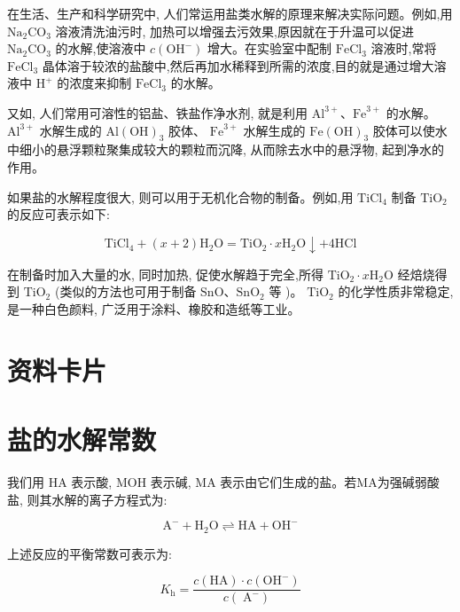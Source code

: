 \documentclass[10pt]{article}
\begin{document}
在生活、生产和科学研究中, 人们常运用盐类水解的原理来解决实际问题。例如,用 \({\mathrm{{Na}}}_{2}{\mathrm{{CO}}}_{3}\) 溶液清洗油污时, 加热可以增强去污效果,原因就在于升温可以促进 \({\mathrm{{Na}}}_{2}{\mathrm{{CO}}}_{3}\) 的水解,使溶液中 \(c\left( {\mathrm{{OH}}}^{ - }\right)\) 增大。在实验室中配制 \({\mathrm{{FeCl}}}_{3}\) 溶液时,常将 \({\mathrm{{FeCl}}}_{3}\) 晶体溶于较浓的盐酸中,然后再加水稀释到所需的浓度,目的就是通过增大溶液中 \({\mathrm{H}}^{ + }\) 的浓度来抑制 \({\mathrm{{FeCl}}}_{3}\) 的水解。

又如, 人们常用可溶性的铝盐、铁盐作净水剂, 就是利用 \({\mathrm{{Al}}}^{3 + }\text{、}{\mathrm{{Fe}}}^{3 + }\) 的水解。 \({\mathrm{{Al}}}^{3 + }\) 水解生成的 \(\mathrm{{Al}}{\left( \mathrm{{OH}}\right) }_{3}\) 胶体、 \({\mathrm{{Fe}}}^{3 + }\) 水解生成的 \(\mathrm{{Fe}}{\left( \mathrm{{OH}}\right) }_{3}\) 胶体可以使水中细小的悬浮颗粒聚集成较大的颗粒而沉降, 从而除去水中的悬浮物, 起到净水的作用。

如果盐的水解程度很大, 则可以用于无机化合物的制备。例如,用 \({\mathrm{{TiCl}}}_{4}\) 制备 \({\mathrm{{TiO}}}_{2}\) 的反应可表示如下:

\[
{\mathrm{{TiCl}}}_{4} + \left( {x + 2}\right) {\mathrm{H}}_{2}\mathrm{O} = {\mathrm{{TiO}}}_{2} \cdot x{\mathrm{H}}_{2}\mathrm{O} \downarrow + 4\mathrm{{HCl}}
\]

在制备时加入大量的水, 同时加热, 促使水解趋于完全,所得 \({\mathrm{{TiO}}}_{2} \cdot x{\mathrm{H}}_{2}\mathrm{O}\) 经焙烧得到 \({\mathrm{{TiO}}}_{2}\) (类似的方法也可用于制备 \(\mathrm{{SnO}}\text{、}{\mathrm{{SnO}}}_{2}\) 等 )。 \({\mathrm{{TiO}}}_{2}\) 的化学性质非常稳定,是一种白色颜料, 广泛用于涂料、橡胶和造纸等工业。

\section*{资料卡片}

\section*{盐的水解常数}

我们用 \(\mathrm{{HA}}\) 表示酸, \(\mathrm{{MOH}}\) 表示碱, \(\mathrm{{MA}}\) 表示由它们生成的盐。若MA为强碱弱酸盐, 则其水解的离子方程式为:

\[
{\mathrm{A}}^{ - } + {\mathrm{H}}_{2}\mathrm{O} \rightleftharpoons \mathrm{{HA}} + {\mathrm{{OH}}}^{ - }
\]

上述反应的平衡常数可表示为:

\[
{K}_{\mathrm{h}} = \frac{c\left( \mathrm{{HA}}\right) \cdot c\left( {\mathrm{{OH}}}^{ - }\right) }{c\left( {\mathrm{\;A}}^{ - }\right) }
\]
\end{document}
